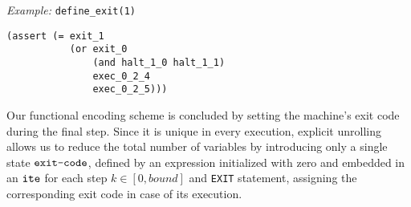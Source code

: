 \noindent
\emph{Example:} \lstinline[style=c++]{define_exit(1)}

\begin{lstlisting}[language=smtlib]
(assert (= exit_1
           (or exit_0
               (and halt_1_0 halt_1_1)
               exec_0_2_4
               exec_0_2_5)))
\end{lstlisting}



\noindent
Our functional encoding scheme is concluded by setting the machine's exit code during the final step.
Since it is unique in every execution, explicit unrolling allows us to reduce the total number of variables by introducing only a single state $\texttt{exit-code}$, %
defined by an expression initialized with zero and embedded in an $\texttt{ite}$
for each step $k \in [0, bound]$ and \lstinline[language={[concubine]Assembler}]{EXIT} statement, assigning the corresponding exit code in case of its execution.

